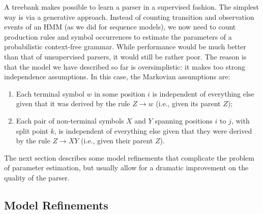A treebank makes possible to learn a parser in a supervised fashion. The simplest way is via a 
generative approach. Instead of counting transition and observation events of an HMM 
(as we did for sequence models), we now need to count production rules and symbol occurrences to 
estimate the parameters of a probabilistic context-free grammar. 
While performance would be much better than that of 
unsupervised parsers, it would still be rather poor. 
The reason is that the model we have described so far is oversimplistic: 
it makes too strong independence assumptions. In this case, the Markovian assumptions are: 
\begin{enumerate}
\item Each terminal symbol $w$ in some position $i$ is independent of everything else given that it was 
derived by the rule $Z \rightarrow w$ (i.e., given its parent $Z$);
\item Each pair of non-terminal symbols $X$ and $Y$ spanning positions $i$ to $j$, with 
split point $k$, is independent of everything else given that they were derived  
by the rule $Z \rightarrow X Y$ (i.e., given their parent $Z$). 
\end{enumerate}

The next section describes some model refinements that complicate the problem of parameter estimation, 
but usually allow for a dramatic improvement on the quality of the parser.


\subsection{Model Refinements}

